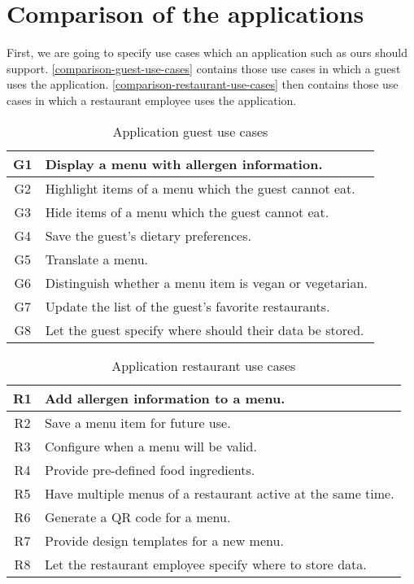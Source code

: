 \section{Comparison of the applications}
First, we are going to specify use cases which an application such as ours should support.
\autoref{comparison-guest-use-cases} contains those use cases in which a guest uses the application.
\autoref{comparison-restaurant-use-cases} then contains those use cases in which a restaurant employee uses the application.

\begin{table}[h]\centering
    \begin{tabular}{| c | l |}
      \hline
      G1 & Display a menu with allergen information. \\
      \hline
      G2 & Highlight items of a menu which the guest cannot eat.  \\
      \hline
      G3 & Hide items of a menu which the guest cannot eat.  \\
      \hline
      G4 & Save the guest's dietary preferences.  \\
      \hline
      G5 & Translate a menu.  \\
      \hline
      G6 & Distinguish whether a menu item is vegan or vegetarian.  \\
      \hline
      G7 & Update the list of the guest's favorite restaurants.  \\
      \hline
      G8 & Let the guest specify where should their data be stored. \\ 
      \hline
    \end{tabular}
    \caption{Application guest use cases}\label{comparison-guest-use-cases}
\end{table}

\begin{table}[h]\centering
  \begin{tabular}{| c | l |}
    \hline
    R1 & Add allergen information to a menu. \\
    \hline
    R2 & Save a menu item for future use. \\
    \hline
    R3 & Configure when a menu will be valid. \\
    \hline
    R4 & Provide pre-defined food ingredients. \\
    \hline
    R5 & Have multiple menus of a restaurant active at the same time. \\    
    \hline
    R6 & Generate a QR code for a menu. \\
    \hline 
    R7 & Provide design templates for a new menu. \\
    \hline 
    R8 & Let the restaurant employee specify where to store data. \\
    \hline
  \end{tabular}
  \caption{Application restaurant use cases}\label{comparison-restaurant-use-cases}
\end{table}

